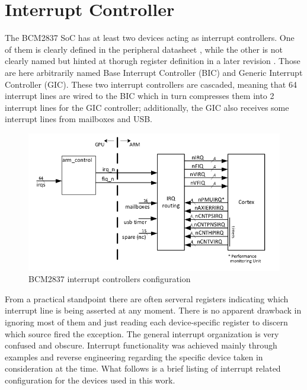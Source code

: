\documentclass[12pt,a4paper,openright,twoside]{report}
\begin{document}
\section{Interrupt Controller}
\label{gic}
The BCM2837 SoC has at least two devices acting as interrupt controllers. One of 
them is clearly defined in the peripheral datasheet \cite{bcm2835}, while the
other is not clearly named but hinted at thorugh register definition in a later 
revision \cite{rev3.4}. Those are here arbitrarily named Base Interrupt Controller (BIC)
and Generic Interrupt Controller (GIC).
These two interrupt controllers are cascaded, meaning that 64 interrupt lines are 
wired to the BIC which in turn compresses them into 2 interrupt lines for the GIC
controller; additionally, the GIC also receives some interrupt lines from mailboxes
and USB.

 \begin{figure}[h]
 \includegraphics[scale=0.55]{images/tesi3.png}
 \caption[Figure 3]{BCM2837 interrupt controllers configuration}\label{fig:interrupt}
 \end{figure}
From a practical standpoint there are often serveral registers indicating which interrupt
line is being asserted at any moment. There is no apparent drawback in ignoring most
of them and just reading each device-specific register to discern which source fired
the exception.
The general interrupt organization is very confused and obscure. Interrupt functionality
was achieved mainly through examples and reverse engineering regarding the specific
device taken in consideration at the time.
What follows is a brief listing of interrupt related configuration for the devices
used in this work.
\end{document}
